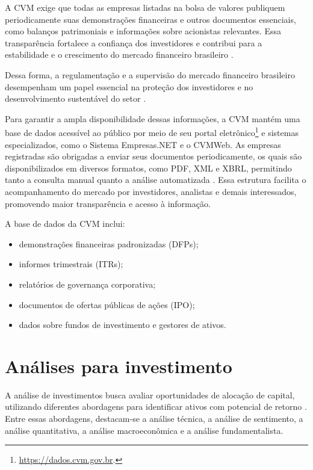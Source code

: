 A CVM exige que todas as empresas listadas na bolsa de valores publiquem periodicamente suas demonstrações financeiras e outros documentos essenciais, como balanços patrimoniais e informações sobre acionistas relevantes. Essa transparência fortalece a confiança dos investidores e contribui para a estabilidade e o crescimento do mercado financeiro brasileiro \cite{fgv:2024:transformacao}.

Dessa forma, a regulamentação e a supervisão do mercado financeiro brasileiro desempenham um papel essencial na proteção dos investidores e no desenvolvimento sustentável do setor \cite{figueiredo:2023:capacidade}.

Para garantir a ampla disponibilidade dessas informações, a CVM mantém uma base de dados acessível ao público por meio de seu portal eletrônico\footnote{\url{https://dados.cvm.gov.br}.}  e sistemas especializados, como o Sistema Empresas.NET e o CVMWeb. As empresas registradas são obrigadas a enviar seus documentos periodicamente, os quais são disponibilizados em diversos formatos, como PDF, XML e XBRL, permitindo tanto a consulta manual quanto a análise automatizada \cite{cvm:2009:informacao}. Essa estrutura facilita o acompanhamento do mercado por investidores, analistas e demais interessados, promovendo maior transparência e acesso à informação.

A base de dados da CVM inclui:

\begin{itemize}
	\item demonstrações financeiras padronizadas (DFPs);
	\item informes trimestrais (ITRs);
	\item relatórios de governança corporativa;
	\item documentos de ofertas públicas de ações (IPO);
	\item dados sobre fundos de investimento e gestores de ativos.
\end{itemize}

\section{Análises para investimento} \label{sec:analises}

A análise de investimentos busca avaliar oportunidades de alocação de capital, utilizando diferentes abordagens para identificar ativos com potencial de retorno \cite{liaw:2011:business}. Entre essas abordagens, destacam-se a análise técnica, a análise de sentimento, a análise quantitativa, a análise macroeconômica e a análise fundamentalista.  


